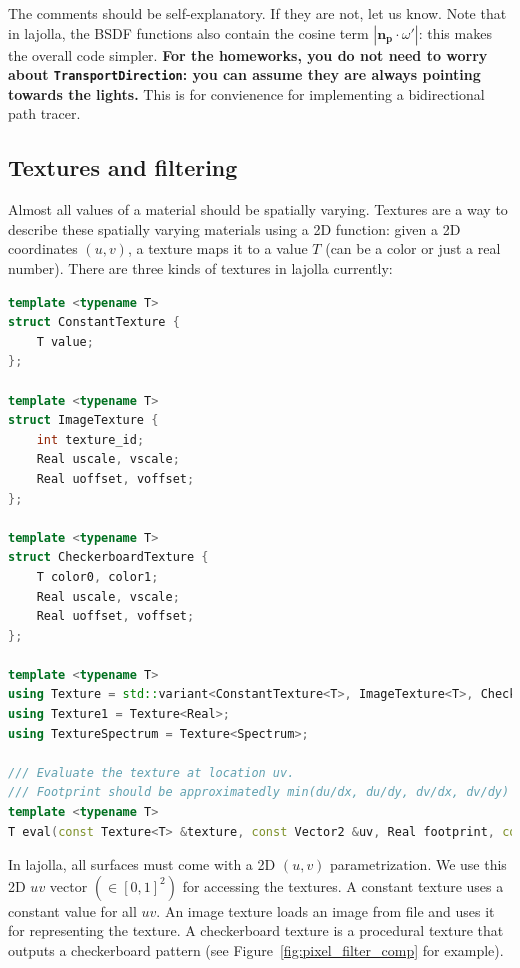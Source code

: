 \documentclass{article}
\begin{document}
The comments should be self-explanatory. If they are not, let us know. Note that in lajolla, the BSDF functions also contain the cosine term $|\mathbf{n}_{\mathbf{p}} \cdot \omega'|$: this makes the overall code simpler. \textbf{For the homeworks, you do not need to worry about \lstinline{TransportDirection}: you can assume they are always pointing towards the lights.} This is for convienence for implementing a bidirectional path tracer.

\subsection{Textures and filtering}
Almost all values of a material should be spatially varying. Textures are a way to describe these spatially varying materials using a 2D function: given a 2D coordinates $(u, v)$, a texture maps it to a value $T$ (can be a color or just a real number). There are three kinds of textures in lajolla currently:

\begin{lstlisting}[language=c++]
template <typename T>
struct ConstantTexture {
    T value;
};

template <typename T>
struct ImageTexture {
    int texture_id;
    Real uscale, vscale;
    Real uoffset, voffset;
};

template <typename T>
struct CheckerboardTexture {
    T color0, color1;
    Real uscale, vscale;
    Real uoffset, voffset;
};

template <typename T>
using Texture = std::variant<ConstantTexture<T>, ImageTexture<T>, CheckerboardTexture<T>>;
using Texture1 = Texture<Real>;
using TextureSpectrum = Texture<Spectrum>;

/// Evaluate the texture at location uv.
/// Footprint should be approximatedly min(du/dx, du/dy, dv/dx, dv/dy) for texture filtering.
template <typename T>
T eval(const Texture<T> &texture, const Vector2 &uv, Real footprint, const TexturePool &pool);
\end{lstlisting}

In lajolla, all surfaces must come with a 2D $(u, v)$ parametrization. We use this 2D $uv$ vector $(\in [0, 1]^2)$ for accessing the textures. A constant texture uses a constant value for all $uv$. An image texture loads an image from file and uses it for representing the texture. A checkerboard texture is a procedural texture that outputs a checkerboard pattern (see Figure~\ref{fig:pixel_filter_comp} for example).
\end{document}
